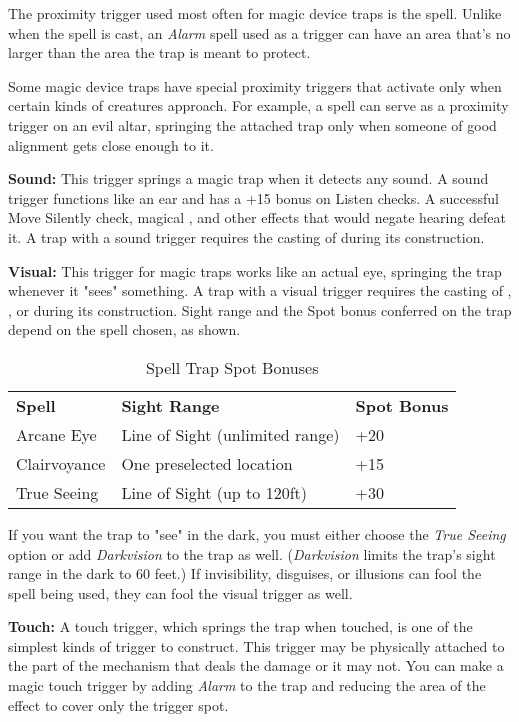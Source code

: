 The proximity trigger used most often for magic device traps is the  
spell. Unlike when the spell is cast, an \textit{Alarm} spell used as a trigger 
can have an area that's no larger than the area the trap is meant to protect.

Some magic device traps have special proximity triggers that activate only when 
certain kinds of creatures approach. For example, a  spell 
can serve as a proximity trigger on an evil altar, springing the attached trap 
only when someone of good alignment gets close enough to it.

\textbf{Sound:} This trigger springs a magic trap when it detects any sound. A 
sound trigger functions like an ear and has a +15 bonus on Listen checks. A successful 
Move Silently check, magical , and other effects that would negate 
hearing defeat it. A trap with a sound trigger requires the casting of  during its construction.

\textbf{Visual:} This trigger for magic traps works like an actual eye, springing 
the trap whenever it "sees" something. A trap with a visual trigger requires 
the casting of , , or  during 
its construction. Sight range and the Spot bonus conferred on the trap depend on 
the spell chosen, as shown.

\begin{table}[htb]
\caption{Spell Trap Spot Bonuses}
\centering
\begin{tabular}{lll}
\textbf{Spell} & \textbf{Sight Range} & \textbf{Spot Bonus}\\
Arcane Eye & Line of Sight (unlimited range) & +20\\
Clairvoyance & One preselected location & +15\\
True Seeing & Line of Sight (up to 120ft) & +30\\
\end{tabular}
\end{table}

If you want the trap to "see" in the dark, you must either choose the \textit{True Seeing}
option or add \textit{Darkvision} to the trap as well. (\textit{Darkvision}
limits the trap's sight range in the dark to 60 feet.) If invisibility, disguises, 
or illusions can fool the spell being used, they can fool the visual trigger as 
well. 

\textbf{Touch:} A touch trigger, which springs the trap when touched, is one of 
the simplest kinds of trigger to construct. This trigger may be physically attached 
to the part of the mechanism that deals the damage or it may not. You can make 
a magic touch trigger by adding \textit{Alarm} to the trap and reducing the area 
of the effect to cover only the trigger spot.

